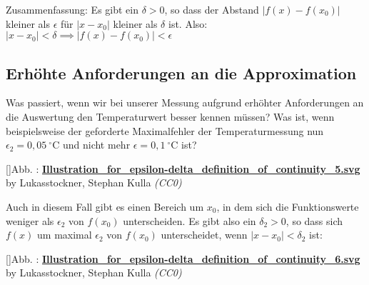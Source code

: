 \documentclass[fontsize=9pt,
               parskip=half-,
               DIV=14,
               listof=chapterentry,
               tocflat]{scrbook}
\newcounter{imagelabel}
\begin{document}
\begin{importantparagraph*}
Zusammenfassung: Es gibt ein $\delta >0$, so dass der Abstand $|f(x)-f(x_{0})|$ kleiner als $\epsilon $ für $|x-x_{0}|$ kleiner als $\delta $ ist. Also: $|x-x_{0}|<\delta \implies |f(x)-f(x_{0})|<\epsilon $

\end{importantparagraph*}

\subsection{Erhöhte Anforderungen an die Approximation}

Was passiert, wenn wir bei unserer Messung aufgrund erhöhter Anforderungen an die Auswertung den Temperaturwert besser kennen müssen? Was ist, wenn beispielsweise der geforderte Maximalfehler der Temperaturmessung nun $\epsilon _{2}=0{,}05\ \mathrm {^{\circ }C} $ und nicht mehr $\epsilon =0{,}1\ \mathrm {^{\circ }C} $ ist?

[]{Abb. : \protect\href{https://commons.wikimedia.org/wiki/File:Illustration_for_epsilon-delta_definition_of_continuity_5.svg}{\textbf{Illustration\allowbreak\_for\allowbreak\_epsilon\allowbreak-delta\allowbreak\_definition\allowbreak\_of\allowbreak\_continuity\allowbreak\_5.svg}} by Lukasstockner, Stephan Kulla \textit{(CC0)}}\begin{center}
\end{center}

Auch in diesem Fall gibt es einen Bereich um $x_{0}$, in dem sich die Funktionswerte weniger als $\epsilon _{2}$ von $f(x_{0})$ unterscheiden. Es gibt also ein $\delta _{2}>0$, so dass sich $f(x)$ um maximal $\epsilon _{2}$ von $f(x_{0})$ unterscheidet, wenn $|x-x_{0}|<\delta _{2}$ ist:

[]{Abb. : \protect\href{https://commons.wikimedia.org/wiki/File:Illustration_for_epsilon-delta_definition_of_continuity_6.svg}{\textbf{Illustration\allowbreak\_for\allowbreak\_epsilon\allowbreak-delta\allowbreak\_definition\allowbreak\_of\allowbreak\_continuity\allowbreak\_6.svg}} by Lukasstockner, Stephan Kulla \textit{(CC0)}}\begin{center}
\end{center}
\end{document}
